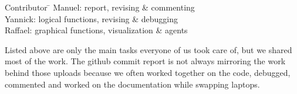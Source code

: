 
\begin{tabbing}
Contributor \= \kill %
Manuel: \> report, revising \& commenting\\ %
Yannick: \> logical functions, revising \& debugging \\ %
Raffael: \> graphical functions, visualization \& agents \\ %
\end{tabbing}

\noi Listed above are only the main tasks everyone of us took care of, but we shared most of the work. The github commit report is not always mirroring the work behind those uploads because we often worked together on the code, debugged, commented and worked on the documentation while swapping laptops.

